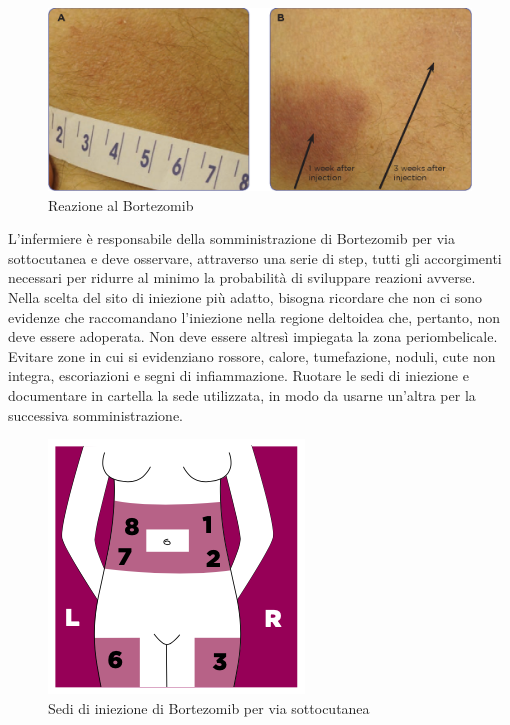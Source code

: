 \begin{figure}[H]
    \begin{center}
    \includegraphics[width=0.7\columnwidth]{img/bortezomibreaction.png}
    \vspace{-3mm}
    \end{center}
    \caption{ Reazione al Bortezomib
    \cite{BORTEZOMIB}}
   
\end{figure}

L’infermiere è responsabile della somministrazione di Bortezomib per via sottocutanea e deve osservare,
attraverso una serie di step, tutti gli accorgimenti necessari per ridurre al minimo la probabilità di sviluppare 
reazioni avverse.\\ 
Nella scelta del sito di iniezione più adatto, bisogna ricordare che non ci sono evidenze che raccomandano l’iniezione 
nella regione deltoidea che, pertanto, non deve essere adoperata. Non deve essere altresì impiegata la zona periombelicale.
Evitare zone in cui si evidenziano rossore, calore, 
tumefazione, noduli, cute non integra, escoriazioni e segni di infiammazione. 
Ruotare le sedi di iniezione e documentare in cartella la sede utilizzata, in modo da usarne 
un’altra per la successiva somministrazione\cite{BORTNURSES}.

\begin{figure}[H]
    \begin{center}
    \includegraphics[width=0.3\columnwidth]{img/SEDI.png}
    \vspace{-3mm}
    \end{center}
    \caption{ Sedi di iniezione di Bortezomib per via sottocutanea
    \cite{BORTEZOMIB}}

\end{figure}

